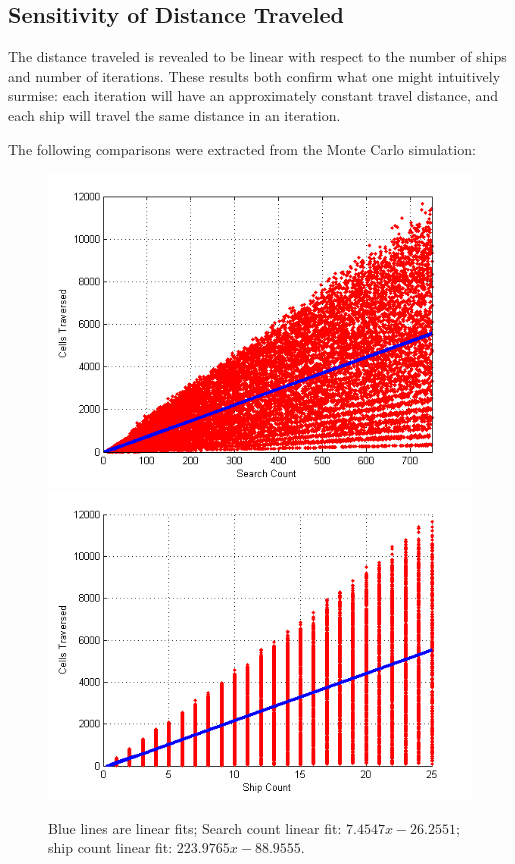 \documentclass[a4paper]{article}
\begin{document}
\subsection{Sensitivity of Distance Traveled}

The distance traveled is revealed to be linear with respect to the number of ships and number of iterations. These results both confirm what one might intuitively surmise: each iteration will have an approximately constant travel distance, and each ship will travel the same distance in an iteration.

The following comparisons were extracted from the Monte Carlo simulation:

\begin{figure}[H]\begin{center}
\includegraphics[scale=0.5]{../Matlab/Images/DistTraveledByIterCount.png}
\includegraphics[scale=0.5]{../Matlab/Images/DistTraveledByShipCount.png}
\caption{Blue lines are linear fits; Search count linear fit: $7.4547x-26.2551$; ship count linear fit: $223.9765x-88.9555$.}
\end{center}\end{figure}
\end{document}
